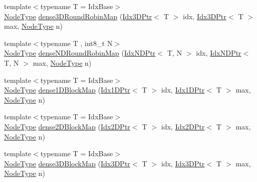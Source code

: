 \begin{DoxyCompactItemize}
\item 
{\footnotesize template$<$typename T  = Idx\+Base$>$ }\\\hyperlink{namespacevt_a866da9d0efc19c0a1ce79e9e492f47e2}{Node\+Type} \hyperlink{namespacevt_1_1mapping_aa48fa3b830b637787c584dbac5bba6db}{dense3\+D\+Round\+Robin\+Map} (\hyperlink{namespacevt_1_1mapping_aacc737158b6517f2d760ffc8d1b5abca}{Idx3\+D\+Ptr}$<$ T $>$ idx, \hyperlink{namespacevt_1_1mapping_aacc737158b6517f2d760ffc8d1b5abca}{Idx3\+D\+Ptr}$<$ T $>$ max, \hyperlink{namespacevt_a866da9d0efc19c0a1ce79e9e492f47e2}{Node\+Type} n)
\item 
{\footnotesize template$<$typename T , int8\+\_\+t N$>$ }\\\hyperlink{namespacevt_a866da9d0efc19c0a1ce79e9e492f47e2}{Node\+Type} \hyperlink{namespacevt_1_1mapping_a270a829564506d7b8de50c9867ff2b76}{dense\+N\+D\+Round\+Robin\+Map} (\hyperlink{namespacevt_1_1mapping_ab77f5302cd346d499e48a8c796043746}{Idx\+N\+D\+Ptr}$<$ T, N $>$ idx, \hyperlink{namespacevt_1_1mapping_ab77f5302cd346d499e48a8c796043746}{Idx\+N\+D\+Ptr}$<$ T, N $>$ max, \hyperlink{namespacevt_a866da9d0efc19c0a1ce79e9e492f47e2}{Node\+Type} n)
\item 
{\footnotesize template$<$typename T  = Idx\+Base$>$ }\\\hyperlink{namespacevt_a866da9d0efc19c0a1ce79e9e492f47e2}{Node\+Type} \hyperlink{namespacevt_1_1mapping_a2d49151f03d4ce393b01c620f6b18517}{dense1\+D\+Block\+Map} (\hyperlink{namespacevt_1_1mapping_a8b576cf2f31069778e4951f64bccafd8}{Idx1\+D\+Ptr}$<$ T $>$ idx, \hyperlink{namespacevt_1_1mapping_a8b576cf2f31069778e4951f64bccafd8}{Idx1\+D\+Ptr}$<$ T $>$ max, \hyperlink{namespacevt_a866da9d0efc19c0a1ce79e9e492f47e2}{Node\+Type} n)
\item 
{\footnotesize template$<$typename T  = Idx\+Base$>$ }\\\hyperlink{namespacevt_a866da9d0efc19c0a1ce79e9e492f47e2}{Node\+Type} \hyperlink{namespacevt_1_1mapping_aca20bcd20c24f4a43e217ca63bf5812c}{dense2\+D\+Block\+Map} (\hyperlink{namespacevt_1_1mapping_a6832cbb1361fe72fd7ec730e7b7773b3}{Idx2\+D\+Ptr}$<$ T $>$ idx, \hyperlink{namespacevt_1_1mapping_a6832cbb1361fe72fd7ec730e7b7773b3}{Idx2\+D\+Ptr}$<$ T $>$ max, \hyperlink{namespacevt_a866da9d0efc19c0a1ce79e9e492f47e2}{Node\+Type} n)
\item 
{\footnotesize template$<$typename T  = Idx\+Base$>$ }\\\hyperlink{namespacevt_a866da9d0efc19c0a1ce79e9e492f47e2}{Node\+Type} \hyperlink{namespacevt_1_1mapping_a91764d84e5e6d8253872740cb8424726}{dense3\+D\+Block\+Map} (\hyperlink{namespacevt_1_1mapping_aacc737158b6517f2d760ffc8d1b5abca}{Idx3\+D\+Ptr}$<$ T $>$ idx, \hyperlink{namespacevt_1_1mapping_aacc737158b6517f2d760ffc8d1b5abca}{Idx3\+D\+Ptr}$<$ T $>$ max, \hyperlink{namespacevt_a866da9d0efc19c0a1ce79e9e492f47e2}{Node\+Type} n)

\end{DoxyCompactItemize}
